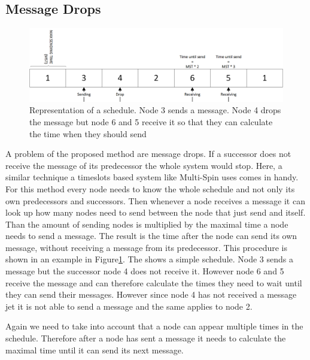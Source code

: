 \subsection{Message Drops}
\label{chp:apr_samplingDrops}
\begin{figure} [htbp]
	\centering         
    \includegraphics[scale=0.6]{content/images/MessageDrop}
    \caption{Representation of a schedule. Node 3 sends a message. Node 4 drops the message but node 6 and 5 receive it so that they can calculate the time when they should send}
    \label{fig:msgDrop}
\end{figure}
A problem of the proposed method are message drops. If a successor does not receive the message of its predecessor the whole system would stop. Here, a similar technique a timeslots based system like Multi-Spin uses comes in handy. For this method every node needs to know the whole schedule and not only its own predecessors and successors. Then whenever a node receives a message it can look up how many nodes need to send between the node that just send and itself. Than the amount of sending nodes is multiplied by the maximal time a node needs to send a message. The result is the time after the node can send its own message, without receiving a message from its predecessor. This procedure is shown in an example in Figure\ref{fig:msgDrop}. The shows a simple schedule. Node 3 sends a message but the successor node 4 does not receive it. However node 6 and 5 receive the message and can therefore calculate the times they need to wait until they can send their messages. However since node 4 has not received a message jet it is not able to send a message and the same applies to node 2. 

Again we need to take into account that a node can appear multiple times in the schedule. Therefore after a node has sent a message it needs to calculate the maximal time until it can send its next message.
